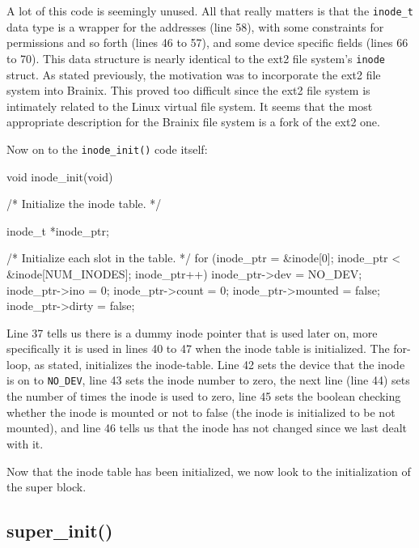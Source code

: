 A lot of this code is seemingly unused. All that really matters is that the \verb|inode_t| data type is a wrapper for the addresses (line 58), with some constraints for permissions and so forth (lines 46 to 57), and some device specific fields (lines 66 to 70). This data structure is nearly identical to the ext2 file system's \verb|inode| struct. As stated previously, the motivation was to incorporate the ext2 file system into Brainix. This proved too difficult since the ext2 file system is intimately related to the Linux virtual file system. It seems that the most appropriate description for the Brainix file system is a fork of the ext2 one. 

Now on to the \verb|inode_init()| code itself:
\begin{code}[numbers=left,firstnumber=32,label={[Beginning of /brainix/src/fs/inode.c]End of /brainix/src/fs/inode.c}]
 void inode_init(void)
 {
 
 /* Initialize the inode table. */

      inode_t *inode_ptr;

      /* Initialize each slot in the table. */
      for (inode_ptr = &inode[0]; inode_ptr < &inode[NUM_INODES]; inode_ptr++)
      {
           inode_ptr->dev = NO_DEV;
           inode_ptr->ino = 0;
           inode_ptr->count = 0;
           inode_ptr->mounted = false;
           inode_ptr->dirty = false;
      }
 }
\end{code}
Line 37 tells us there is a dummy inode pointer that is used later on, more specifically it is used in lines 40 to 47 when the inode table is initialized. The for-loop, as stated, initializes the inode-table. Line 42 sets the device that the inode is on to \verb|NO_DEV|, line 43 sets the inode number to zero, the next line (line 44) sets the number of times the inode is used to zero, line 45 sets the boolean checking whether the inode is mounted or not to false (the inode is initialized to be not mounted), and line 46 tells us that the inode has not changed since we last dealt with it.

Now that the inode table has been initialized, we now look to the initialization of the super block.

\subsection{super\_init()}

